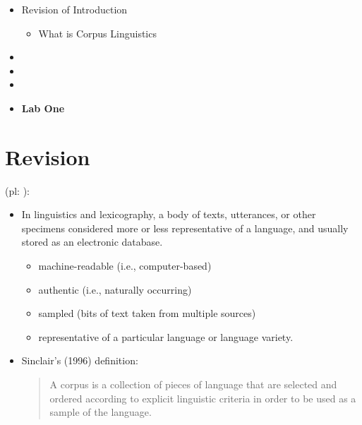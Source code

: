 \documentclass[a4paper,landscape,headrule,footrule,xetex]{foils}
\begin{document}
\maketitle



\begin{itemize} 
\item Revision of Introduction
  \begin{itemize}
  \item What is Corpus Linguistics
  \end{itemize}
\item {}
\item {}
\item {}
\item \textbf{Lab One}
\end{itemize}



\section{Revision}



 (pl: ):
\begin{itemize}
\item In linguistics and lexicography, a body of texts, utterances, or other
specimens considered more or less representative
of a language, and usually stored as an electronic
database. 
  \begin{itemize}
  \item machine-readable (i.e., computer-based)
  \item authentic (i.e., naturally occurring)
  \item sampled (bits of text taken from multiple sources)
  \item representative of a particular language or language variety.
  \end{itemize}
\item  Sinclair's (1996) definition:
  \begin{quote}
    A corpus is a collection of pieces of language that are selected and
    ordered according to explicit linguistic criteria in order to be used as a
    sample of the language.
\end{quote}
\end{itemize}
\end{document}
